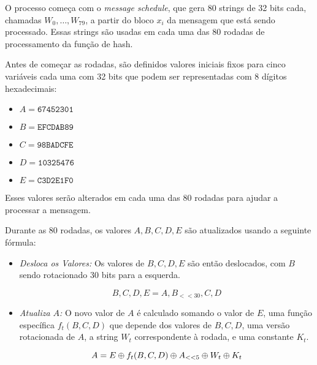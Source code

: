 O processo começa com o \textit{message schedule}, que gera 80 strings de 32 bits cada, chamadas $W_0, \dots, W_{79}$, a partir do bloco $x_i$ da mensagem que está sendo processado.
Essas strings são usadas em cada uma das 80 rodadas de processamento da função de hash.

Antes de começar as rodadas, são definidos valores iniciais fixos para cinco variáveis cada uma com 32 bits que podem ser representadas com 8 dígitos hexadecimais: 

\begin{itemize}
  \item[] $A = \texttt{67452301}$
  \item[] $B = \texttt{EFCDAB89}$
  \item[] $C = \texttt{98BADCFE}$
  \item[] $D = \texttt{10325476}$
  \item[] $E = \texttt{C3D2E1F0}$
\end{itemize}

Esses valores serão alterados em cada uma das 80 rodadas para ajudar a processar a mensagem.

Durante as 80 rodadas, os valores $A, B, C, D, E$ são atualizados usando a seguinte fórmula:

\begin{itemize}
\item[] {\em Desloca os Valores:}
  Os valores de $B, C, D, E$ são então deslocados, com $B$ sendo rotacionado 30 bits para a esquerda.

  \begin{displaymath}
    B, C, D, E = A, B_{<<30}, C, D 
  \end{displaymath}

\item[] {\em Atualiza $A$:}
  O novo valor de $A$ é calculado somando o valor de $E$, uma função específica $f_t(B,C,D)$ que depende dos valores de $B, C, D$, uma versão rotacionada de $A$, a string $W_t$ correspondente à rodada, e uma constante $K_t$.

  \begin{displaymath}
    A = E \oplus f_t(B,C,D) \oplus A_{<<5} \oplus W_t \oplus K_t
  \end{displaymath}
\end{itemize}

